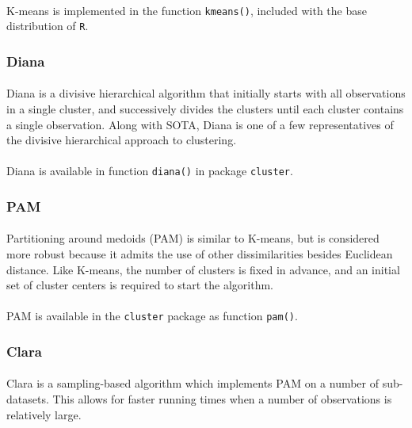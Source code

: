\documentclass[10pt]{article}\usepackage[]{graphicx}\usepackage[]{color}
\begin{document}
\paragraph{}
K-means is implemented in the function \texttt{kmeans()}, included with the base 
distribution of \texttt{R}.


\subsubsection{Diana}
\paragraph{}
Diana is a divisive hierarchical algorithm that initially starts with all 
observations in a single cluster, and successively divides the clusters until each
cluster contains a single observation. Along with SOTA, Diana is one of a
few representatives of the divisive hierarchical approach to clustering. 
\paragraph{}
Diana is available in function \texttt{diana()} in package \texttt{cluster}. 


\subsubsection{PAM}
\paragraph{}
Partitioning around medoids (PAM) is similar to K-means, but is considered
more robust because it admits the use of other dissimilarities besides Euclidean
distance. Like K-means, the number of clusters is fixed in advance,
and an initial set of cluster centers is required to start the algorithm. 
\paragraph{}
PAM is available in the \texttt{cluster} package as function \texttt{pam()}.


\subsubsection{Clara}
\paragraph{}
Clara is a sampling-based algorithm which implements PAM on a number
of sub-datasets. This allows for faster
running times when a number of observations is relatively large. 
\end{document}
